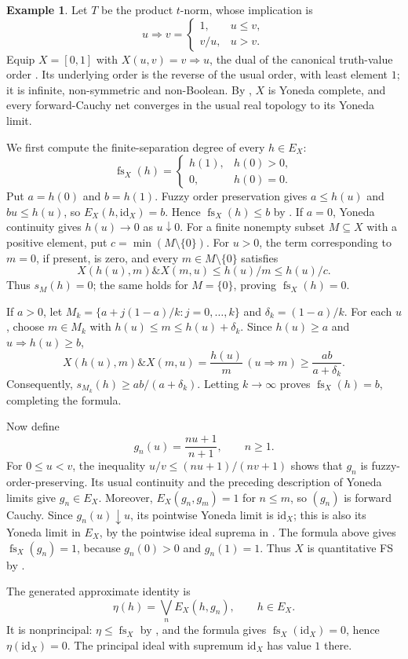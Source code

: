 \documentclass[preprint,3p,times]{elsarticle}
\theoremstyle{definition}
\newtheorem{example}[example]{Example}
\theoremstyle{remark}
\newcommand{\id}{\mathrm{id}}
\newcommand{\fs}{\operatorname{fs}}
\newcommand{\tn}{\mathbin{\&}}
\numberwithin{equation}{section}
\begin{document}
\begin{example}\label{ex:product-dual-fs}
Let \(T\) be the product \(t\)-norm, whose implication is
\[
 u\Rightarrow v=
 \begin{cases}
  1,&u\leq v,\\
  v/u,&u>v.
 \end{cases}
\]
Equip \(X=[0,1]\) with \(X(u,v)=v\Rightarrow u\), the dual of the canonical truth-value order \cite[Example~4.3(i)]{Zhang2024}. Its underlying order is the reverse of the usual order, with least element \(1\); it is infinite, non-symmetric and non-Boolean. By \cite[Lemma~9.5]{Zhang2024}, \(X\) is Yoneda complete, and every forward-Cauchy net converges in the usual real topology to its Yoneda limit.

We first compute the finite-separation degree of every \(h\in E_X\):
\[
 \fs_X(h)=
 \begin{cases}
  h(1),&h(0)>0,\\
  0,&h(0)=0.
 \end{cases}
\]
Put \(a=h(0)\) and \(b=h(1)\). Fuzzy order preservation gives \(a\leq h(u)\) and \(bu\leq h(u)\), so \(E_X(h,\id_X)=b\). Hence \(\fs_X(h)\leq b\) by .
If \(a=0\), Yoneda continuity gives \(h(u)\to0\) as \(u\downarrow0\). For a finite nonempty subset \(M\subseteq X\) with a positive element, put \(c=\min(M\setminus\{0\})\). For \(u>0\), the term corresponding to \(m=0\), if present, is zero, and every \(m\in M\setminus\{0\}\) satisfies
\[
 X(h(u),m)\tn X(m,u)\leq h(u)/m\leq h(u)/c.
\]
Thus \(s_M(h)=0\); the same holds for \(M=\{0\}\), proving \(\fs_X(h)=0\).

If \(a>0\), let \(M_k=\{a+j(1-a)/k:j=0,\ldots,k\}\) and \(\delta_k=(1-a)/k\). For each \(u\), choose \(m\in M_k\) with \(h(u)\leq m\leq h(u)+\delta_k\). Since \(h(u)\geq a\) and \(u\Rightarrow h(u)\geq b\),
\[
 X(h(u),m)\tn X(m,u)
 =\frac{h(u)}{m}\,(u\Rightarrow m)
 \geq\frac{ab}{a+\delta_k}.
\]
Consequently, \(s_{M_k}(h)\geq ab/(a+\delta_k)\). Letting \(k\to\infty\) proves \(\fs_X(h)=b\), completing the formula.

Now define
\[
 g_n(u)=\frac{nu+1}{n+1},\qquad n\geq1.
\]
For \(0\leq u<v\), the inequality \(u/v\leq(nu+1)/(nv+1)\) shows that \(g_n\) is fuzzy-order-preserving. Its usual continuity and the preceding description of Yoneda limits give \(g_n\in E_X\). Moreover, \(E_X(g_n,g_m)=1\) for \(n\leq m\), so \((g_n)\) is forward Cauchy. Since \(g_n(u)\downarrow u\), its pointwise Yoneda limit is \(\id_X\); this is also its Yoneda limit in \(E_X\), by the pointwise ideal suprema in . The formula above gives \(\fs_X(g_n)=1\), because \(g_n(0)>0\) and \(g_n(1)=1\). Thus \(X\) is quantitative FS by .

The generated approximate identity is
\[
 \eta(h)=\bigvee_n E_X(h,g_n),\qquad h\in E_X.
\]
It is nonprincipal: \(\eta\leq\fs_X\) by , and the formula gives \(\fs_X(\id_X)=0\), hence \(\eta(\id_X)=0\). The principal ideal with supremum \(\id_X\) has value \(1\) there.
\end{example}
\end{document}

